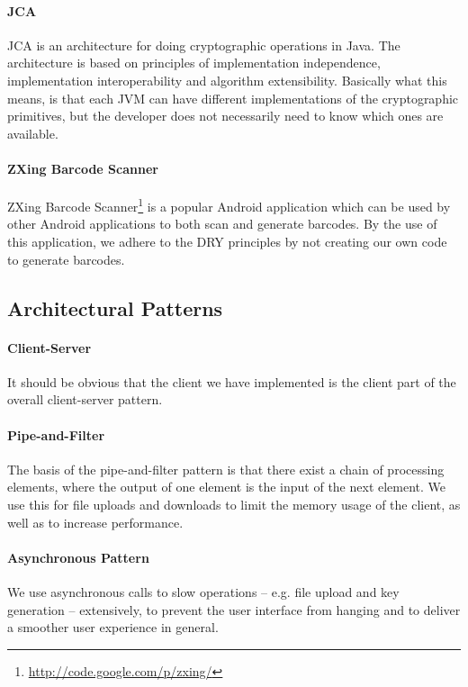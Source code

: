 \documentclass[pdftex,english,10pt,b5paper,twoside]{book}
\begin{document}
\paragraph{\ac{JCA}} \ac{JCA} is an architecture for doing cryptographic
operations in Java. The architecture is based on principles of implementation
independence, implementation interoperability and algorithm extensibility.
Basically what this means, is that each \ac{JVM} can have different
implementations of the cryptographic primitives, but the developer does not
necessarily need to know which ones are available.  

\paragraph{ZXing Barcode Scanner} ZXing Barcode Scanner\footnote
{\url{http://code.google.com/p/zxing/}} is a popular Android application which
can be used by other Android applications to both scan and generate barcodes.
By the use of this application, we adhere to the \ac{DRY} principles by not
creating our own code to generate barcodes.

\subsection{Architectural Patterns}

\paragraph{Client-Server} It should be obvious that the client we have
implemented is the client part of the overall client-server pattern.

\paragraph{Pipe-and-Filter} The basis of the pipe-and-filter pattern is that
there exist a chain of processing elements, where the output of one element is
the input of the next element. We use this for file uploads and downloads to
limit the memory usage of the client, as well as to increase performance.

\paragraph{Asynchronous Pattern} We use asynchronous calls to slow operations
-- e.g. file upload and key generation -- extensively, to prevent the user
interface from hanging and to deliver a smoother user experience in general.
\end{document}
